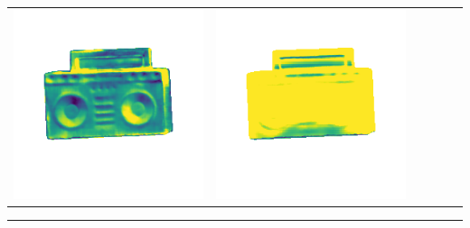 \begin{tabularx}{\linewidth}{@{}Y@{}Y@{}Y@{}Y@{}Y@{}Y@{}}
\includegraphics[width=\linewidth]{semisynthetic/20160617_19_marrnet_err.png} &
\includegraphics[width=\linewidth]{semisynthetic/20160617_19_ef_err.png} \\
\end{tabularx}
\begin{center}\rule{0.5\linewidth}{\linethickness}\end{center}


